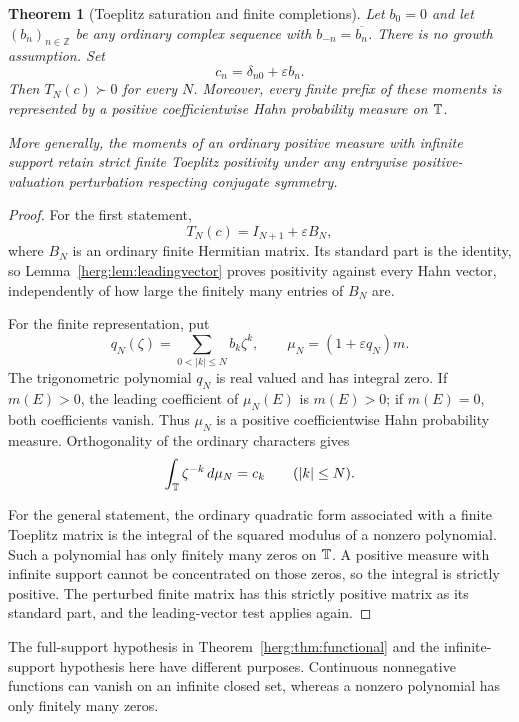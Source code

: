 \documentclass[11pt,letterpaper]{article}
\newtheorem{theorem}{Theorem}[section]
\theoremstyle{definition}
\newcommand{\Z}{\mathbb Z}\newcommand{\N}{\mathbb N}
\newcommand{\eps}{\varepsilon}
\newcommand{\dd}{\,d}
\numberwithin{equation}{section}
\begin{document}
\begin{theorem}[Toeplitz saturation and finite completions]\label{herg:thm:saturation}
Let $b_0=0$ and let $(b_n)_{n\in\Z}$ be any ordinary complex sequence with $b_{-n}=\overline{b_n}$. There is no growth assumption. Set
\begin{equation}\label{herg:eq:saturatedmoments}
 c_n=\delta_{n0}+\eps b_n.
\end{equation}
Then $T_N(c)\succ0$ for every $N$. Moreover, every finite prefix of these moments is represented by a positive coefficientwise Hahn probability measure on $\mathbb T$.

More generally, the moments of an ordinary positive measure with infinite support retain strict finite Toeplitz positivity under any entrywise positive-valuation perturbation respecting conjugate symmetry.
\end{theorem}
\begin{proof}
For the first statement,
\[
 T_N(c)=I_{N+1}+\eps B_N,
\]
where $B_N$ is an ordinary finite Hermitian matrix. Its standard part is the identity, so Lemma~\ref{herg:lem:leadingvector} proves positivity against every Hahn vector, independently of how large the finitely many entries of $B_N$ are.

For the finite representation, put
\[
 q_N(\zeta)=\sum_{0<|k|\le N}b_k\zeta^k,
 \qquad \mu_N=(1+\eps q_N)m.
\]
The trigonometric polynomial $q_N$ is real valued and has integral zero. If $m(E)>0$, the leading coefficient of $\mu_N(E)$ is $m(E)>0$; if $m(E)=0$, both coefficients vanish. Thus $\mu_N$ is a positive coefficientwise Hahn probability measure. Orthogonality of the ordinary characters gives
\[
 \int_\T\zeta^{-k}\dd\mu_N=c_k\qquad(|k|\le N).
\]

For the general statement, the ordinary quadratic form associated with a finite Toeplitz matrix is the integral of the squared modulus of a nonzero polynomial. Such a polynomial has only finitely many zeros on $\mathbb T$. A positive measure with infinite support cannot be concentrated on those zeros, so the integral is strictly positive. The perturbed finite matrix has this strictly positive matrix as its standard part, and the leading-vector test applies again.
\end{proof}

The full-support hypothesis in Theorem~\ref{herg:thm:functional} and the infinite-support hypothesis here have different purposes. Continuous nonnegative functions can vanish on an infinite closed set, whereas a nonzero polynomial has only finitely many zeros.
\end{document}
